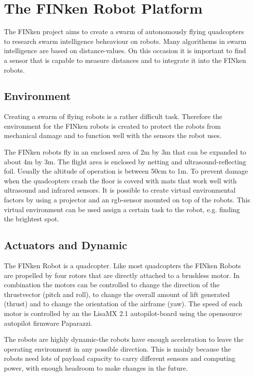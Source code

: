 \section{The FINken Robot Platform}


The FINken project aims to create a swarm of autonomously flying quadcopters to research swarm intelligence beheaviour on robots.
Many algorithems in swarm intelligence are based on distance-values. 
On this occasion it is important to find a sensor that is capable to measure distances and to integrate it into the FINken robots. 

\subsection{Environment}
Creating a swarm of flying robots is a rather difficult task.
Therefore the environment for the FINken robots is created to protect the robots from mechanical damage and to function well with the sensors the robot uses.

The FINken robots fly in an enclosed area of 2m by 3m that can be expanded to about 4m by 3m.
The flight area is enclosed by netting and ultrasound-reflecting foil.
Usually the altitude of operation is between 50cm to 1m.
To prevent damage when the quadcopters crash the floor is coverd with mats that work well with ultrasound and infrared sensors.
It is possible to create virtual environmental factors by using a projector and an rgb-sensor mounted on top of the robots.
This virtual environment can be used assign a certain task to the robot, e.g. finding the brightest spot.

\subsection{Actuators and Dynamic} 
The FINken Robot is a quadcopter.
Like most quadcopters the FINken Robots are propelled by four rotors that are directly attached to a brushless motor.
In combination the motors can be controlled to change the direction of the thrustvector (pitch and roll), to change the overall amount of lift generated (thrust) and to change the orientation of the airframe (yaw).
The speed of each motor is controlled by an the Lisa\/MX 2.1 autopilot-board\cite{_lisa/mx_????} using the opensource autopilot firmware Paparazzi\cite{_paparazziuav_????}.

The robots are highly dynamic-the robots have enough acceleration to leave the operating environment in any possible direction.
This is mainly because the robots need lots of payload capacity to carry different sensors and computing power, with enough headroom to make changes in the future.


